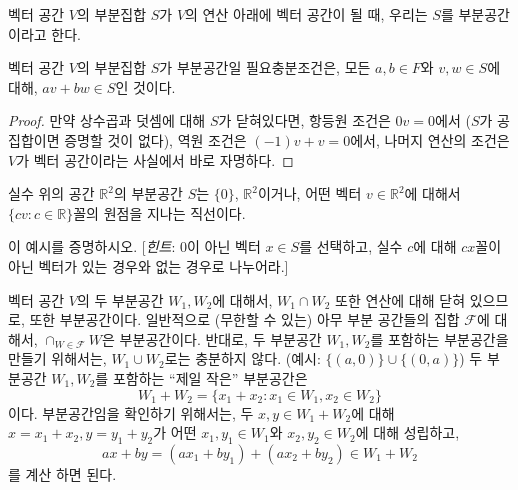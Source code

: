 \begin{definition}
\label{def:subspace}
    벡터 공간 $V$의 부분집합 $S$가 $V$의 연산 아래에 벡터 공간이 될 때, 우리는 $S$를 부분공간이라고 한다.
\end{definition}

\begin{lemma}
    벡터 공간 $V$의 부분집합 $S$가 부분공간일 필요충분조건은, 모든 $a, b \in F$와 $v, w \in S$에 대해, $av + bw \in S$인 것이다.
\end{lemma}
\begin{proof}
    만약 상수곱과 덧셈에 대해 $S$가 닫혀있다면, 항등원 조건은 $0v = 0$에서 ($S$가 공집합이면 증명할 것이 없다), 역원 조건은 $(-1)v + v = 0$에서, 나머지 연산의 조건은 $V$가 벡터 공간이라는 사실에서 바로 자명하다.
\end{proof}

\begin{example}
    실수 위의 공간 $\mathbb{R}^2$의 부분공간 $S$는 $\{0\}$, $\mathbb{R}^2$이거나, 어떤 벡터 $v \in \mathbb{R}^2$에 대해서 $\{cv : c \in \mathbb{R}\}$꼴의 원점을 지나는 직선이다.
\end{example}
\begin{exercise}
    이 예시를 증명하시오. [\textit{힌트}: $0$이 아닌 벡터 $x \in S$를 선택하고, 실수 $c$에 대해 $cx$꼴이 아닌 벡터가 있는 경우와 없는 경우로 나누어라.]
\end{exercise}

벡터 공간 $V$의 두 부분공간 $W_1, W_2$에 대해서, $W_1 \cap W_2$ 또한 연산에 대해 닫혀 있으므로, 또한 부분공간이다.
일반적으로 (무한할 수 있는) 아무 부분 공간들의 집합 $\mathcal{F}$에 대해서, $\cap_{W \in \mathcal{F}} W$은 부분공간이다.
반대로, 두 부분공간 $W_1, W_2$를 포함하는 부분공간을 만들기 위해서는, $W_1 \cup W_2$로는 충분하지 않다. (예시: $\{(a, 0)\} \cup \{(0, a)\}$)
두 부분공간 $W_1, W_2$를 포함하는 ``제일 작은'' 부분공간은
\begin{equation*}
    W_1 + W_2 = \{x_1 + x_2 : x_1 \in W_1, x_2 \in W_2\}
\end{equation*}
이다.
부분공간임을 확인하기 위해서는, 두 $x, y \in W_1 + W_2$에 대해 $x = x_1 + x_2, y = y_1 + y_2$가 어떤 $x_1, y_1 \in W_1$와 $x_2, y_2 \in W_2$에 대해 성립하고,
\begin{equation*}
    ax + by = (ax_1 + by_1) + (ax_2 + by_2) \in W_1 + W_2
\end{equation*}
를 계산 하면 된다.

